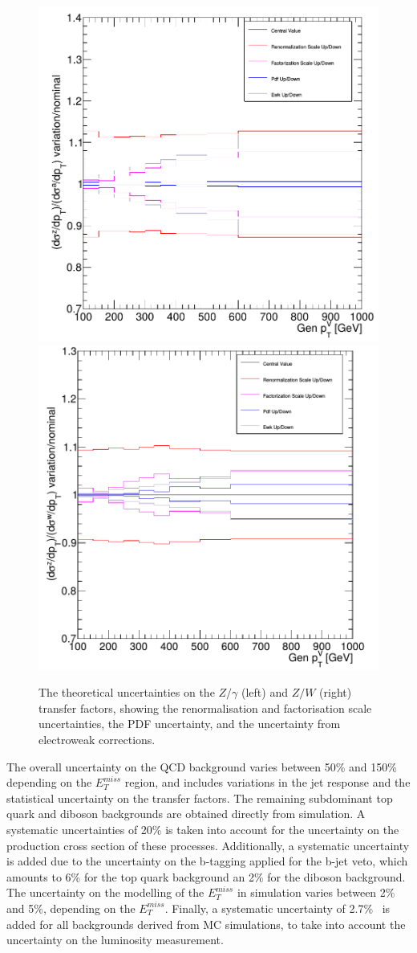 \begin{figure}[ht]
  \centering
 \includegraphics[width=.49\textwidth]{syst1.png} 
 \includegraphics[width=.49\textwidth]{syst2.png}
 \caption{The theoretical uncertainties on the $Z/\gamma$ (left) and $Z/W$ (right) transfer factors, showing the renormalisation and factorisation scale uncertainties, the \ac{PDF} uncertainty, and the uncertainty from electroweak corrections.}
 \label{fig:transfer_factors_unc}
\end{figure}

The overall uncertainty on the QCD background varies between 50\% and 150\% depending on the $E_T^{miss}$ region, and includes variations in the jet response and the statistical uncertainty on the transfer factors. The remaining subdominant top quark and diboson backgrounds are obtained directly from simulation. A systematic uncertainties  of 20\% is taken into account for the uncertainty on the production cross section of these processes. Additionally, a systematic uncertainty is added due to the uncertainty on the b-tagging applied for the b-jet veto, which amounts to 6\% for the top quark background an 2\% for the diboson background. The uncertainty on the modelling of the $E_T^{miss}$ in simulation varies between 2\% and 5\%, depending on the $E_T^{miss}$. Finally, a systematic uncertainty of 2.7\%~\cite{CMS:2016eto} is added for all backgrounds derived from MC simulations, to take into account the uncertainty on the luminosity measurement.

